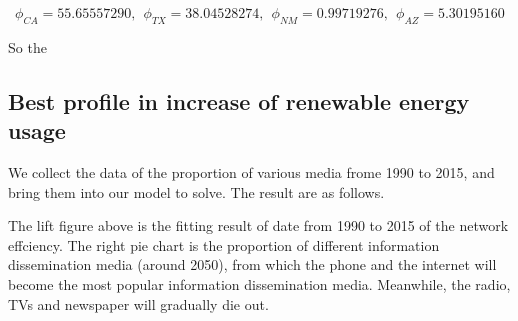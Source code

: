 \documentclass[a4paper,11pt]{article}
\begin{document}
\begin{equation}
    \phi_{CA} = 55.65557290,~~ \phi_{TX} = 38.04528274,~~ \phi_{NM} = 0.99719276,~~ \phi_{AZ} = 5.30195160
\end{equation}

\par So the 

\subsection{Best profile in increase of renewable energy usage}

\par We collect the data of the proportion of various media frome 1990 to 2015, and bring them into our model to solve. The result are as follows.

\par The lift figure above is the fitting result of date from 1990 to 2015\cite{RK} of the network effciency. The right pie chart is the proportion of different information dissemination media (around 2050), from which the phone and the internet will become the most popular information dissemination media. Meanwhile, the radio, TVs and newspaper will gradually die out.
\end{document}
